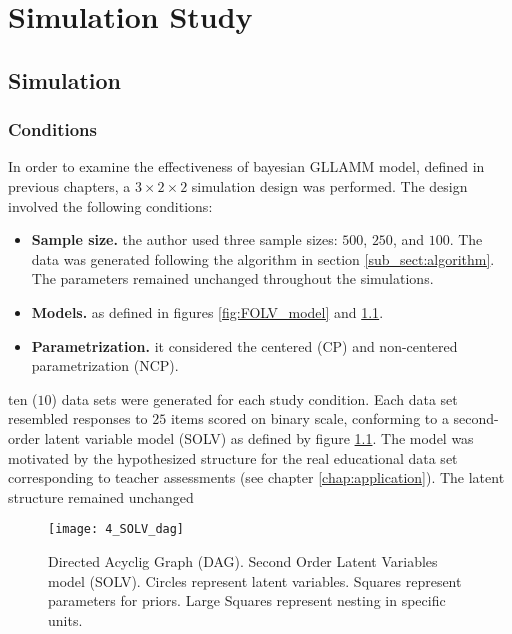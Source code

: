 \chapter{Simulation Study} \label{chap:simulation}

\section{Simulation}

\subsection{Conditions}

In order to examine the effectiveness of bayesian GLLAMM model, defined in previous chapters, a $3 \times 2 \times 2$ simulation design was performed. The design involved the following conditions:
%
\begin{itemize}
	\item \textbf{Sample size.} the author used three sample sizes: $500$, $250$, and $100$. The data was generated following the algorithm in section \ref{sub_sect:algorithm}. The parameters remained unchanged throughout the simulations.
	\item \textbf{Models.} as defined in figures \ref{fig:FOLV_model} and \ref{fig:SOLV_model}.
	\item \textbf{Parametrization.} it considered the centered (CP) and non-centered parametrization (NCP). 
\end{itemize}

ten ($10$) data sets were generated for each study condition. Each data set resembled responses to $25$ items scored on binary scale, conforming to a second-order latent variable model (SOLV) as defined by figure \ref{fig:SOLV_model}. The model was motivated by the hypothesized structure for the real educational data set corresponding to teacher assessments (see chapter \ref{chap:application}). The latent structure remained unchanged
%
\begin{figure}[h]
	\centering
	\texttt{[image: 4\_SOLV\_dag]}
	\caption[Directed Acyclic Graph (DAG). Second Order Latent Variables model (SOLV).]%
	{Directed Acyclig Graph (DAG). Second Order Latent Variables model (SOLV). Circles represent latent variables. Squares represent parameters for priors. Large Squares represent nesting in specific units.}
	\label{fig:SOLV_model}
\end{figure}



